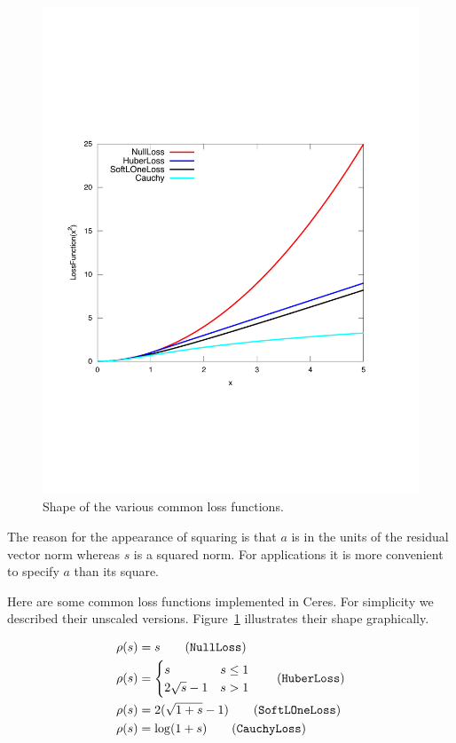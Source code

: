 \begin{figure}[hbt]
\includegraphics[width=\textwidth]{loss.pdf}
\caption{Shape of the various common loss functions.}
\label{fig:loss}
\end{figure}


The reason for the appearance of squaring is that $a$ is in the units of the residual vector norm whereas $s$ is a squared norm. For applications it is more convenient to specify $a$ than
its square.

Here are some common loss functions implemented in Ceres. For simplicity we described their unscaled versions. Figure~\ref{fig:loss} illustrates their shape graphically.

\begin{align}
		\rho(s)&=s \tag{\texttt{NullLoss}}\\
		\rho(s) &= \begin{cases}
		       s & s \le 1\\
		       2 \sqrt{s} - 1 & s > 1
	           \end{cases} \tag{\texttt{HuberLoss}}\\
		\rho(s) &= 2 (\sqrt{1+s} - 1) \tag{\texttt{SoftLOneLoss}}\\
		\rho(s) &= \log(1 + s) \tag{\texttt{CauchyLoss}}
\end{align}

